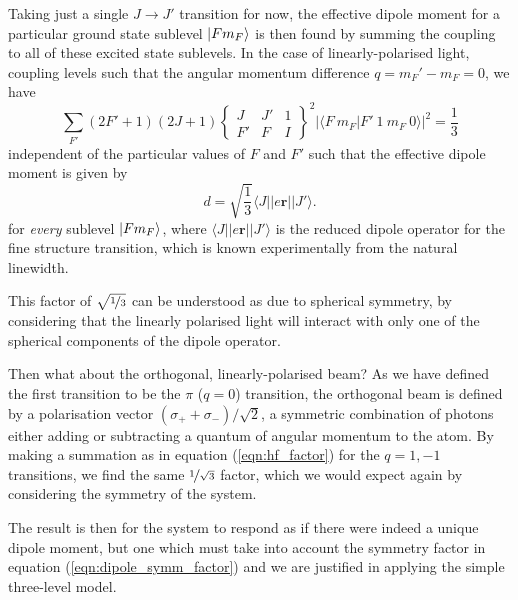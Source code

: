     Taking just a single $J \rightarrow J'$ transition for now, the effective
    dipole moment for a particular ground state sublevel $\Ket{F m_F}$ is then
    found by summing the coupling to all of these excited state sublevels.  In
    the case of linearly-polarised light, coupling levels such that the angular
    momentum difference $q = m_F' - m_F = 0$, we have\cite{Steck2001}
    \begin{equation}\label{eqn:hf_factor}
      \sum_{F'} (2 F' + 1)(2 J + 1) 
        \begin{Bmatrix}
          J & J' & 1 \\[8pt]
          F' & F & I
        \end{Bmatrix}^2
        \lvert \langle F~m_F \vert F'~1~m_F~0 \rangle \rvert^2 = \frac{1}{3}
    \end{equation}
    independent of the particular values of $F$ and $F'$ such that the effective dipole moment is given by
    \begin{equation}\label{eqn:dipole_symm_factor}
      d = 
        \sqrt{\frac{1}{3}} \langle J || e \mathbf{r} || J' \rangle.
    \end{equation}
    for \textit{every} sublevel $\Ket{F m_F}$, where $\langle J || e \mathbf{r}
    || J' \rangle$ is the reduced dipole operator for the fine structure
    transition, which is known experimentally from the natural linewidth.

    This factor of $\sqrt{\nicefrac{1}{3}}$ can be understood as due to
    spherical symmetry, by considering that the linearly polarised light will
    interact with only one of the spherical components of the dipole operator.

    Then what about the orthogonal, linearly-polarised beam? As we have defined
    the first transition to be the $\pi$ ($q = 0$) transition, the orthogonal
    beam is defined by a polarisation vector $\left( \sigma_+ + \sigma_- \right)
    / \sqrt{2}$, a symmetric combination of photons either adding or subtracting
    a quantum of angular momentum to the atom. By making a summation as in
    equation (\ref{eqn:hf_factor}) for the $q = 1, -1$ transitions, we find the
    same $\nicefrac{1}{\sqrt{3}}$ factor, which we would expect again by
    considering the symmetry of the system.

    The result is then for the system to respond as if there were indeed a
    unique dipole moment, but one which must take into account the symmetry
    factor in equation (\ref{eqn:dipole_symm_factor}) and we are justified in
    applying the simple three-level model.

